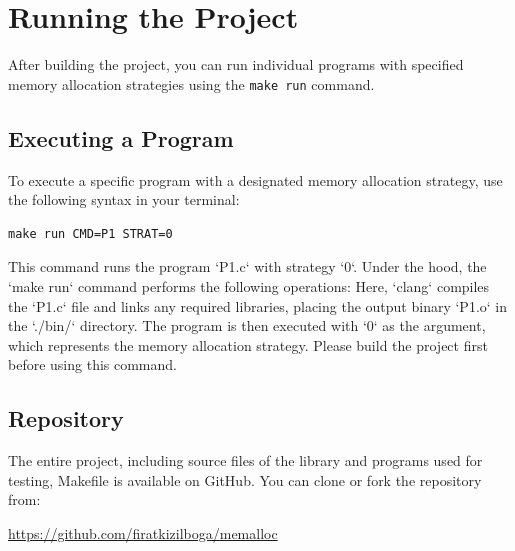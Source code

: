 \documentclass[conference]{IEEEtran}
\begin{document}
\section{Running the Project}
After building the project, you can run individual programs with specified memory allocation strategies using the \texttt{make run} command.

\subsection{Executing a Program}
To execute a specific program with a designated memory allocation strategy, use the following syntax in your terminal:
\begin{lstlisting}
make run CMD=P1 STRAT=0
\end{lstlisting}
This command runs the program `P1.c` with strategy `0`. Under the hood, the `make run` command performs the following operations:
Here, `clang` compiles the `P1.c` file and links any required libraries, placing the output binary `P1.o` in the `./bin/` directory. The program is then executed with `0` as the argument, which represents the memory allocation strategy. Please build the project first before using this command.

\subsection{Repository}
The entire project, including source files of the library and programs used for testing, Makefile is available on GitHub. You can clone or fork the repository from:
\begin{center}
\url{https://github.com/firatkizilboga/memalloc}
\end{center}
\end{document}
